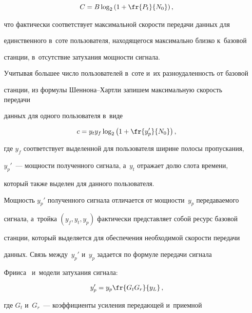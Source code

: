 \begin{equation*}


C= B  \log_2\left(1+\fr{P_t}{N_0}\right),


\end{equation*}


что фактически соответствует максимальной ско\-рости передачи данных для 


единственного в~соте пользователя, находящегося максимально близ\-ко к~базовой 


станции, в~отсутствие затухания мощ\-ности сигнала.





Учитывая большее число пользователей в~соте и~их разноудаленность от базовой 


станции, из формулы Шен\-но\-на--Харт\-ли запишем максимальную скорость передачи 


данных для одного пользователя в~виде


\begin{equation*}


c = y_t  y_f  \log_2\left(1+\fr{y_p'}{N_0}\right),


\end{equation*}


где $y_f$ соответствует выделенной для пользователя ширине полосы пропускания, 


$y_p'$~--- мощности полученного сигнала, а~$y_t$ отражает долю слота времени, 


который также выделен для данного пользователя.





Мощность $y_p'$ полученного сигнала отличается от мощ\-ности~$y_p$ передаваемого 


сигнала, а~тройка $(y_f,y_t,y_p)$ фактически представляет собой ресурс базовой 


станции, который выделяется для обеспечения необходимой скорости передачи 


данных. Связь между~$y_p'$ и~$y_p$ задается по формуле передачи сигнала 


Фрииса~\cite{Moltchanov2022} и~модели затухания сигнала:


\begin{equation*}


y_p' = y_p  \fr{G_t G_r}{y_L} \,,


\end{equation*}


где $G_t$ и~$G_r$~--- коэффициенты усиления передающей и~приемной 


